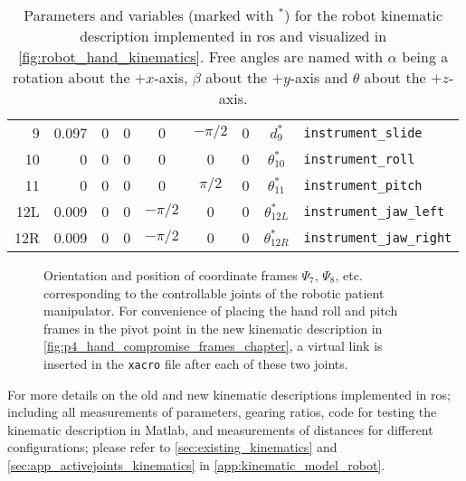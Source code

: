 \begin{table}[htbp]
{\begin{tabular}{r | rrr | ccc | c l}
		9 & 0.097 & 0 & 0 & 0 & $-\pi/2$ &  0 & $d_9^*$ & \texttt{instrument\_slide} \\
		10 & 0 & 0 & 0 & 0 & 0 & 0 & $\theta_{10}^*$ & \texttt{instrument\_roll} \\
		11 & 0 & 0 & 0 & 0 & $\pi/2$ & 0 & $\theta_{11}^*$ & \texttt{instrument\_pitch} \\
		12L & 0.009 & 0 & 0 & $-\pi/2$ & 0 & 0 & $\theta_{12L}^*$ & \texttt{instrument\_jaw\_left} \\
		12R & 0.009 & 0 & 0 & $-\pi/2$ & 0 & 0 & $\theta_{12R}^*$ & \texttt{instrument\_jaw\_right} \\
		\end{tabular}\label{tab:new_kin_short}}
	\caption{Parameters and variables (marked with $^*$) for the robot kinematic description implemented in \gls{ros} and visualized in \autoref{fig:robot_hand_kinematics}. Free angles are named with $\alpha$ being a rotation about the $+x$-axis, $\beta$ about the $+y$-axis and $\theta$ about the $+z$-axis.}
	\label{tab:xacro_param_short}
\end{table}



\begin{figure}[htbp]
\hspace*{-15mm}
\begin{minipage}{1.15\textwidth}
	\vspace*{5mm}
	\caption{Orientation and position of coordinate frames $\Psi_7$, $\Psi_8$, etc. corresponding to the controllable joints of the robotic patient manipulator.  For convenience of placing the hand roll and pitch frames in the pivot point in the new kinematic description in \autoref{fig:p4_hand_compromise_frames_chapter}, a virtual link is inserted in the \texttt{xacro} file after each of these two joints.}
	\label{fig:robot_hand_kinematics}
\end{minipage}
\end{figure}


For more details on the old and new kinematic descriptions implemented in \gls{ros}; including all measurements of parameters, gearing ratios, code for testing the kinematic description in Matlab, and measurements of distances for different configurations; please refer to \autoref{sec:existing_kinematics} and \ref{sec:app_activejoints_kinematics} in \autoref{app:kinematic_model_robot}.










